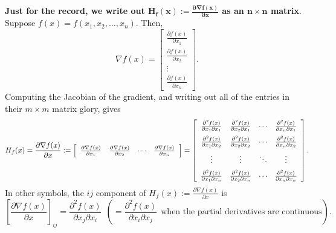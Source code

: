 \textbf{Just for the record, we write out $\bm{ H_f(x):= \frac{\partial \nabla f(x)}{\partial x}  }$ as an $\bm{n \times n}$ matrix}. Suppose
$f(x) = f(x_1, x_2, \dots, x_n) $. Then, 
$$\nabla f(x) =\left[
\begin{array}{c}
\frac{\partial f(x)}{\partial x_1} \\[1em]
\frac{\partial f(x)}{\partial x_2}\\[1em]
\vdots \\
\frac{\partial f(x)}{\partial x_n}
\end{array}
\right] .$$
Computing the Jacobian of the gradient, and writing out all of the entries in their $m \times m$ matrix glory, gives
\begin{equation}
    \label{eq:VectorFunctions04}
   H_f(x) =  \frac{\partial \nabla f(x)}{\partial x} := \left[\begin{array}{cccc}
      \frac{\partial \nabla f(x)}{\partial x_1} & \frac{\partial \nabla  f(x)}{\partial x_2} & \cdots & \frac{\partial \nabla f(x)}{\partial x_n}
    \end{array} \right] =\left[\begin{array}{cccc}
      \frac{\partial^2 f(x)}{\partial x_1 \partial x_1} & \frac{\partial^2 f(x)}{\partial x_2 \partial x_1} & \cdots & \frac{\partial^2 f(x)}{\partial x_n \partial x_1} \medskip \\
      \frac{\partial^2 f(x)}{\partial x_1 \partial x_2} & \frac{\partial^2 f(x)}{\partial x_2 \partial x_2} & \cdots & \frac{\partial^2 f(x)}{\partial x_n \partial x_2} \medskip \\
      \vdots & \vdots & \ddots & \vdots \medskip \\
      \frac{\partial^2 f(x)}{\partial x_1 \partial x_n} & \frac{\partial^2 f(x)}{\partial x_2 \partial x_n} & \cdots & \frac{\partial^2 f(x)}{\partial x_n \partial x_n} 
    \end{array} \right].
\end{equation}
In other symbols, the $ij$ component of $H_f(x) :=\frac{\partial \nabla f(x)}{\partial x}$ is
\begin{equation}
\label{eq:HessianEachEntry}
\left[ \frac{\partial \nabla f(x)}{\partial x}  \right]_{ij} = \frac{\partial^2 f(x)}{\partial x_j \partial x_i} ~~\left(= \frac{\partial^2 f(x)}{\partial x_i \partial x_j}  ~~\text{when the partial derivatives are continuous}\right).
\end{equation}


